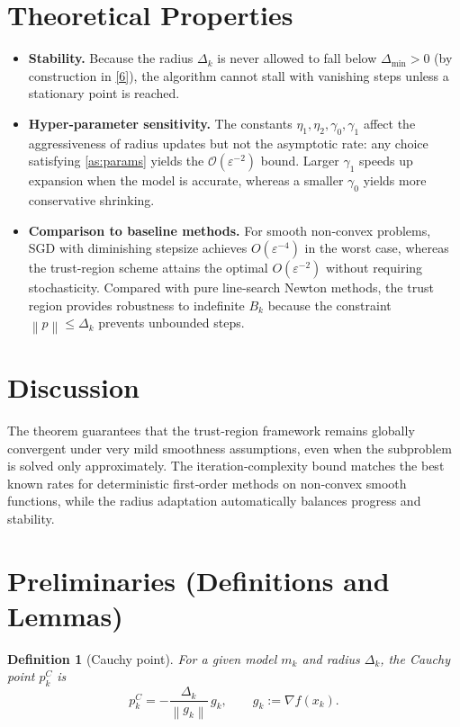 \documentclass{article}
\newtheorem{definition}{Definition}
\newcommand{\norm}[1]{\left\lVert#1\right\rVert}
\begin{document}
\section*{Theoretical Properties}
\begin{itemize}
\item \textbf{Stability.}  Because the radius $\Delta_{k}$ is never allowed to fall below $\Delta_{\min}>0$ (by construction in \eqref{6}), the algorithm cannot stall with vanishing steps unless a stationary point is reached.
\item \textbf{Hyper‑parameter sensitivity.}  The constants $\eta_{1},\eta_{2},\gamma_{0},\gamma_{1}$ affect the aggressiveness of radius updates but not the asymptotic rate: any choice satisfying \ref{as:params} yields the $\mathcal{O}(\varepsilon^{-2})$ bound. Larger $\gamma_{1}$ speeds up expansion when the model is accurate, whereas a smaller $\gamma_{0}$ yields more conservative shrinking.
\item \textbf{Comparison to baseline methods.}  For smooth non‑convex problems, SGD with diminishing stepsize achieves $O(\varepsilon^{-4})$ in the worst case, whereas the trust‑region scheme attains the optimal $O(\varepsilon^{-2})$ without requiring stochasticity.  Compared with pure line‑search Newton methods, the trust region provides robustness to indefinite $B_{k}$ because the constraint $\norm{p}\le\Delta_{k}$ prevents unbounded steps.
\end{itemize}

\section*{Discussion}
The theorem guarantees that the trust‑region framework remains globally convergent under very mild smoothness assumptions, even when the subproblem is solved only approximately.  The iteration‑complexity bound matches the best known rates for deterministic first‑order methods on non‑convex smooth functions, while the radius adaptation automatically balances progress and stability.

\newpage
\section*{Preliminaries (Definitions and Lemmas)}
\begin{definition}[Cauchy point]\label{def:cauchy}
For a given model $m_{k}$ and radius $\Delta_{k}$, the Cauchy point $p_{k}^{C}$ is
\[
p_{k}^{C}= -\frac{\Delta_{k}}{\norm{g_{k}}}\,g_{k},
\qquad g_{k}:=\nabla f(x_{k}).
\]
\end{definition}
\end{document}

